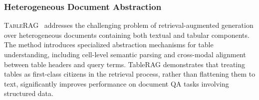 \documentclass{article}
\begin{document}
\subsubsection{Heterogeneous Document Abstraction}

\textsc{TableRAG}~\citep{TableRAG} addresses the challenging problem of retrieval-augmented generation over heterogeneous documents containing both textual and tabular components. The method introduces specialized abstraction mechanisms for table understanding, including cell-level semantic parsing and cross-modal alignment between table headers and query terms. TableRAG demonstrates that treating tables as first-class citizens in the retrieval process, rather than flattening them to text, significantly improves performance on document QA tasks involving structured data.

\begin{table}[t]
    \centering
    \scriptsize
    \caption{Comparative analysis of query abstraction methods.}
    \label{tab:abstraction}
\end{table}
\end{document}
